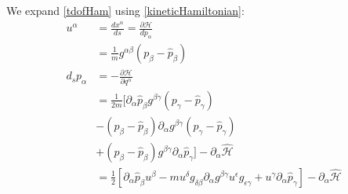 \documentclass[aps,pra,10pt,twocolumn,floatfix,nofootinbib]{revtex4-1}
\theoremstyle{definition}
\begin{document}
We expand \ref{tdofHam} using \ref{kineticHamiltonian}:
\begin{align*}
u^\alpha &= \frac{dx^\alpha}{ds} = \frac{\partial \mathcal{H}}{dp_\alpha} \\
&= \frac{1}{m}g^{\alpha\beta}(p_\beta-\hat{p}_\beta) \\
d_s p_\alpha &= - \frac{\partial \mathcal{H}}{\partial q^\alpha} \\
&=\frac{1}{2m}[\partial_\alpha \hat{p}_\beta g^{\beta \gamma} (p_\gamma -\hat{p}_\gamma) \\
 &- (p_\beta -\hat{p}_\beta) \partial_\alpha g^{\beta \gamma} (p_\gamma -\hat{p}_\gamma) \\
 &+ (p_\beta -\hat{p}_\beta) g^{\beta \gamma} \partial_\alpha \hat{p}_\gamma ]- \partial_\alpha \hat{\mathcal{H}} \\
&=\frac{1}{2}[\partial_\alpha \hat{p}_\beta u^\beta
- m u^\delta g_{\delta\beta} \partial_\alpha g^{\beta \gamma} u^\epsilon g_{\epsilon\gamma}
+ u^\gamma \partial_\alpha \hat{p}_\gamma ]- \partial_\alpha \hat{\mathcal{H}}
\end{align*}
\end{document}
